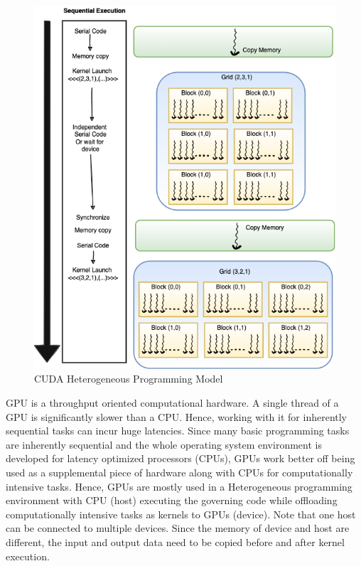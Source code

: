 \begin{figure}[ht]
\begin{minipage}{0.35\textwidth}
    \end{minipage}
    \begin{minipage}{0.6\textwidth}
        \includegraphics[width=\textwidth]{fig/heterogeneous-programming.png}
    \end{minipage}
    \caption{CUDA Heterogeneous Programming Model}
    \label{fig:Heterogenous-Programming}
\end{figure}
GPU is a throughput oriented computational hardware.
A single thread of a GPU is significantly slower than a CPU. Hence, working with it for inherently sequential tasks can incur huge latencies.
Since many basic programming tasks are inherently sequential and the whole operating system environment is developed for latency optimized processors (CPUs), GPUs work better off being used as a supplemental piece of hardware along with CPUs for computationally intensive tasks.
Hence, GPUs are mostly used in a Heterogeneous programming environment with CPU (host) executing the governing code while offloading computationally intensive tasks as kernels to GPUs (device).
Note that one host can be connected to multiple devices.
Since the memory of device and host are different, the input and output data need to be copied before and after kernel execution.
